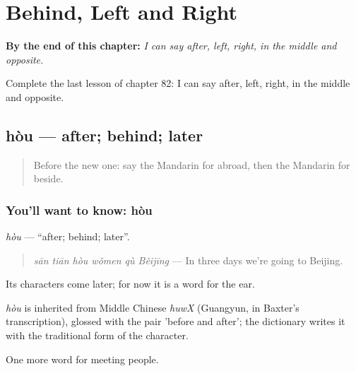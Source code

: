 
\chapter{Behind, Left and Right}
\label{ch:zh-behind-left-and-right}

\begin{chapteropening}
\textbf{By the end of this chapter:} \emph{I can say after, left, right, in the middle and opposite.}

Complete the last lesson of chapter 82: I can say after, left, right, in the middle and opposite.
\end{chapteropening}

\section[hòu]{hòu — after; behind; later}

\label{lesson:ZH-C82-hou}



\begin{quote}
Before the new one: say the Mandarin for abroad, then the Mandarin for beside.
\end{quote}

\subsection*{You'll want to know: hòu}
\emph{hòu} — \textquotedblleft{}after; behind; later\textquotedblright{}.

\begin{quote}
\emph{sān tiān hòu wǒmen qù Běijīng} — In three days we're going to Beijing.
\end{quote}

Its characters come later; for now it is a word for the ear.

\begin{cousinweb}
\emph{hòu} is inherited from Middle Chinese \emph{huwX} (Guangyun, in Baxter's transcription), glossed with the pair 'before and after'; the dictionary writes it with the traditional form of the character.
\end{cousinweb}

\begin{grammarlens}[title={What you've built}]
One more word for meeting people.
\end{grammarlens}

